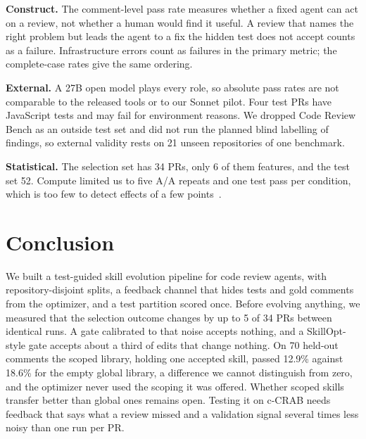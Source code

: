 \documentclass[sigconf, authorversion, nonacm]{acmart}
\begin{document}
\textbf{Construct.} The comment-level pass rate measures whether a fixed agent can act on a review, not whether a human would find it useful. A review that names the right problem but leads the agent to a fix the hidden test does not accept counts as a failure. Infrastructure errors count as failures in the primary metric; the complete-case rates give the same ordering.

\textbf{External.} A 27B open model plays every role, so absolute pass rates are not comparable to the released tools or to our Sonnet pilot. Four test PRs have JavaScript tests and may fail for environment reasons. We dropped Code Review Bench as an outside test set and did not run the planned blind labelling of findings, so external validity rests on 21 unseen repositories of one benchmark.

\textbf{Statistical.} The selection set has 34 PRs, only 6 of them features, and the test set 52. Compute limited us to five A/A repeats and one test pass per condition, which is too few to detect effects of a few points~\cite{button2013power}.

\section{Conclusion}
We built a test-guided skill evolution pipeline for code review agents, with repository-disjoint splits, a feedback channel that hides tests and gold comments from the optimizer, and a test partition scored once. Before evolving anything, we measured that the selection outcome changes by up to 5 of 34 PRs between identical runs. A gate calibrated to that noise accepts nothing, and a SkillOpt-style gate accepts about a third of edits that change nothing. On 70 held-out comments the scoped library, holding one accepted skill, passed 12.9\% against 18.6\% for the empty global library, a difference we cannot distinguish from zero, and the optimizer never used the scoping it was offered. Whether scoped skills transfer better than global ones remains open. Testing it on c-CRAB needs feedback that says what a review missed and a validation signal several times less noisy than one run per PR.



\end{document}
